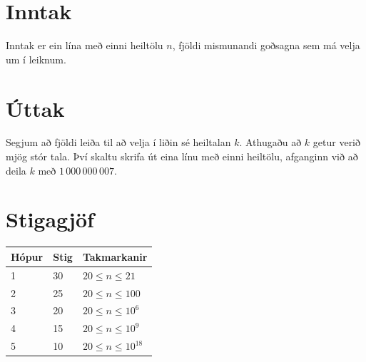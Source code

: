 \section*{Inntak}
Inntak er ein lína með einni heiltölu $n$, fjöldi mismunandi goðsagna sem má velja um í leiknum.

\section*{Úttak}
Segjum að fjöldi leiða til að velja í liðin sé heiltalan $k$.
Athugaðu að $k$ getur verið mjög stór tala.
Því skaltu skrifa út eina línu með einni heiltölu, afganginn við að deila $k$ með $1\,000\,000\,007$.

\section*{Stigagjöf}
\begin{tabular}{|l|l|l|}
\hline
Hópur & Stig & Takmarkanir \\ \hline
1     & 30   & $20 \leq n \leq 21$ \\ \hline
2     & 25   & $20 \leq n \leq 100$ \\ \hline
3     & 20   & $20 \leq n \leq 10^{6}$ \\ \hline
4     & 15   & $20 \leq n \leq 10^{9}$ \\ \hline
5     & 10   & $20 \leq n \leq 10^{18}$ \\ \hline
\end{tabular}
